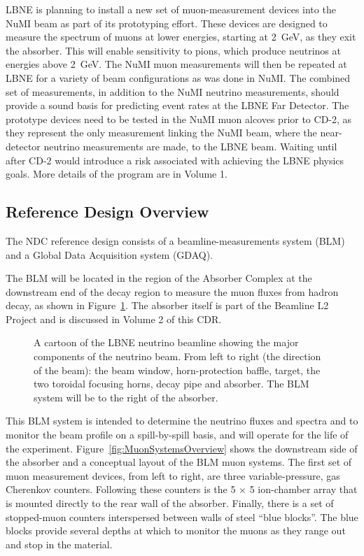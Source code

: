 
LBNE is planning to install a new set of muon-measurement devices into the 
NuMI beam as part of its prototyping effort. 
These devices are designed to measure the spectrum of muons at lower energies, starting at 2~GeV, as they exit the absorber. This will enable sensitivity to pions, which produce neutrinos at energies above 2~GeV. The NuMI muon measurements will then be repeated at LBNE for a variety of beam configurations as was done in NuMI. The combined set of measurements, in addition to the NuMI neutrino measurements, should provide a sound basis for predicting event rates at the LBNE Far Detector.
The prototype devices need to be tested in the NuMI muon alcoves prior to CD-2, as they represent the only measurement linking the NuMI beam, where the near-detector neutrino measurements are made, to the LBNE beam. Waiting until after CD-2 would introduce a risk associated with achieving the LBNE physics goals.  More details of the program are in Volume 1.

\subsection{Reference Design Overview}  %

The NDC reference design consists of a beamline-measurements system (BLM) and a Global Data Acquisition system (GDAQ).

The BLM will be located in the region of the Absorber Complex at the downstream end 
of the decay region to measure the muon fluxes from hadron decay, as shown in Figure~\ref{fig:schematic-nu-beamline-ndc}. The absorber itself is part of the Beamline L2 Project and is discussed in Volume 2 of this CDR. 

\begin{figure}[htbp]
\centering
\caption[Cartoon of the LBNE neutrino beamline components]{A cartoon of the LBNE neutrino beamline showing the major components of the neutrino beam. From left to right (the direction of the beam): the beam window, horn-protection baffle, target, the two toroidal focusing horns, decay pipe and absorber. The BLM system will be to the right of the absorber.}
\label{fig:schematic-nu-beamline-ndc}
\end{figure}

This BLM system is intended to determine the neutrino fluxes and spectra
and to monitor the beam profile on a spill-by-spill basis, and will operate for the life of the
experiment. 
Figure~\ref{fig:MuonSystemsOverview} shows the downstream side of the absorber and a conceptual 
layout of the BLM muon systems.
The first set 
of muon measurement devices, from  left to right, are three
variable-pressure, gas Cherenkov counters. Following these counters 
is the 5 $\times$ 5 ion-chamber array that is
 mounted directly to the rear wall of the absorber. 
Finally, there is a set of stopped-muon counters 
 interspersed between walls of steel ``blue blocks''. The blue blocks 
provide several
 depths at which to monitor the muons as they range out and stop 
in the material.

